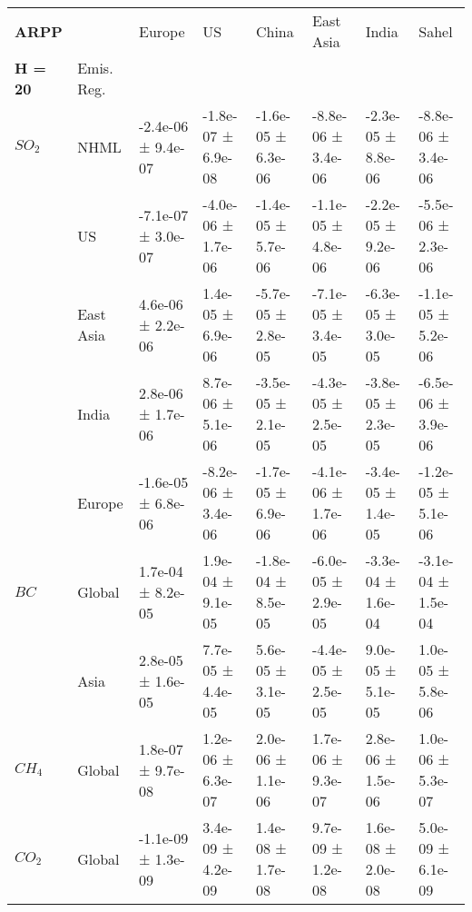 \documentclass[preview]{standalone}
\newcommand{\nm}{\phantom{-}}
\begin{document}
	\tiny
	\begin{minipage}{\textwidth}
		\setlength\tabcolsep{5pt}
		\begin{tabular}{llllllll}
			\toprule
			\textbf{ARPP}       &        &               Europe &                   US &                China &            East Asia &                India &                Sahel \\
			\textbf{H = 20} & Emis. Reg. &                      &                      &                      &                      &                      &                      \\
			\midrule
$SO_2$ & NHML &  -2.4e-06 ±  9.4e-07 &  -1.8e-07 ±  6.9e-08 &  -1.6e-05 ±  6.3e-06 &  -8.8e-06 ±  3.4e-06 &  -2.3e-05 ±  8.8e-06 &  -8.8e-06 ±  3.4e-06 \\
       & US &  -7.1e-07 ±  3.0e-07 &  -4.0e-06 ±  1.7e-06 &  -1.4e-05 ±  5.7e-06 &  -1.1e-05 ±  4.8e-06 &  -2.2e-05 ±  9.2e-06 &  -5.5e-06 ±  2.3e-06 \\
       & East Asia &   \nm4.6e-06 ±  2.2e-06 &   \nm1.4e-05 ±  6.9e-06 &  -5.7e-05 ±  2.8e-05 &  -7.1e-05 ±  3.4e-05 &  -6.3e-05 ±  3.0e-05 &  -1.1e-05 ±  5.2e-06 \\
       & India &   \nm2.8e-06 ±  1.7e-06 &   \nm8.7e-06 ±  5.1e-06 &  -3.5e-05 ±  2.1e-05 &  -4.3e-05 ±  2.5e-05 &  -3.8e-05 ±  2.3e-05 &  -6.5e-06 ±  3.9e-06 \\
       & Europe &  -1.6e-05 ±  6.8e-06 &  -8.2e-06 ±  3.4e-06 &  -1.7e-05 ±  6.9e-06 &  -4.1e-06 ±  1.7e-06 &  -3.4e-05 ±  1.4e-05 &  -1.2e-05 ±  5.1e-06 \\
\cmidrule(lr){1-8}
$BC$ & Global &   \nm1.7e-04 ±  8.2e-05 &   \nm1.9e-04 ±  9.1e-05 &  -1.8e-04 ±  8.5e-05 &  -6.0e-05 ±  2.9e-05 &  -3.3e-04 ±  1.6e-04 &  -3.1e-04 ±  1.5e-04 \\
       & Asia &   \nm2.8e-05 ±  1.6e-05 &   \nm7.7e-05 ±  4.4e-05 &   \nm5.6e-05 ±  3.1e-05 &  -4.4e-05 ±  2.5e-05 &   \nm9.0e-05 ±  5.1e-05 &   \nm1.0e-05 ±  5.8e-06 \\
\cmidrule(lr){1-8}
$CH_4$ & Global &   \nm1.8e-07 ±  9.7e-08 &   \nm1.2e-06 ±  6.3e-07 &   \nm2.0e-06 ±  1.1e-06 &   \nm1.7e-06 ±  9.3e-07 &   \nm2.8e-06 ±  1.5e-06 &   \nm1.0e-06 ±  5.3e-07 \\
\cmidrule(lr){1-8}
$CO_2$ & Global &  -1.1e-09 ±  1.3e-09 &   \nm3.4e-09 ±  4.2e-09 &   \nm1.4e-08 ±  1.7e-08 &   \nm9.7e-09 ±  1.2e-08 &   \nm1.6e-08 ±  2.0e-08 &   \nm5.0e-09 ±  6.1e-09 \\
\bottomrule
\end{tabular}

        \end{minipage}
        
\end{document}
